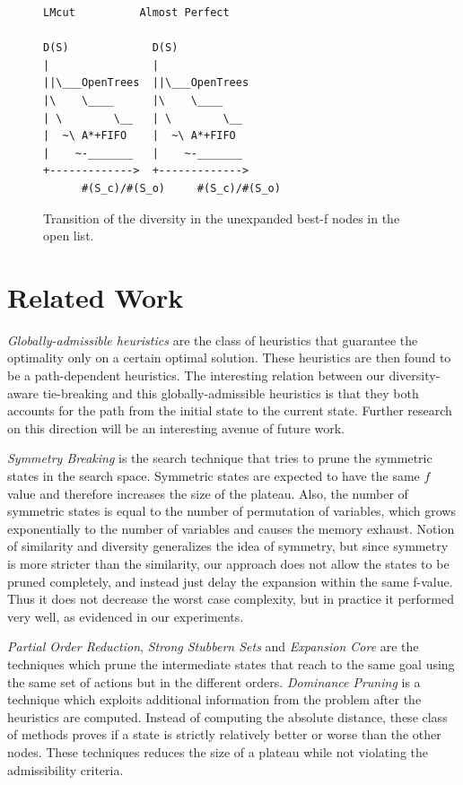 \begin{figure}[htbp]
\begin{verbatim}
LMcut          Almost Perfect       

D(S)             D(S)                             
|                |             
||\___OpenTrees  ||\___OpenTrees
|\    \____      |\    \____   
| \        \__   | \        \__
|  ~\ A*+FIFO    |  ~\ A*+FIFO 
|    ~-_______   |    ~-_______
+------------->  +------------->
      #(S_c)/#(S_o)     #(S_c)/#(S_o)
\end{verbatim}
\caption{Transition of the diversity in the unexpanded best-f nodes in the open list.}
\label{diversity-transition}
\end{figure}

\section{Related Work}
\label{sec-4}
\emph{Globally-admissible heuristics} \cite{karpas2012optimal} are the class of heuristics that guarantee the optimality only on a certain optimal solution. These heuristics are then found to be a path-dependent heuristics. The interesting relation between our diversity-aware tie-breaking and this globally-admissible heuristics is that they both accounts for the path from the initial state to the current state. Further research on this direction will be an interesting avenue of  future work.

\emph{Symmetry Breaking} \cite{Fox1998,pochter2011exploiting,domshlak2013symmetry} is the search technique that tries to prune the symmetric states in the search space. Symmetric states are expected to have the same $f$ value and therefore increases the size of the plateau. Also, the number of symmetric states is equal to the number of permutation of variables, which grows exponentially to the number of variables and causes the memory exhaust. Notion of similarity and diversity generalizes the idea of symmetry, but since symmetry is more stricter than the similarity, our approach does not allow the states to be pruned completely, and instead just delay the expansion within the same f-value. Thus it does not decrease the worst case complexity, but in practice it performed very well, as evidenced in our experiments.

\emph{Partial Order Reduction}, \emph{Strong Stubbern Sets} and \emph{Expansion Core} are the techniques which prune the intermediate states that reach to the same goal using the same set of actions but in the different orders. \emph{Dominance Pruning} \cite{erol1994} is a technique which exploits additional information from the problem after the heuristics are computed. Instead of computing the absolute distance, these class of methods proves if a state is strictly relatively better or worse than the other nodes. These techniques reduces the size of a plateau while not violating the admissibility criteria.

